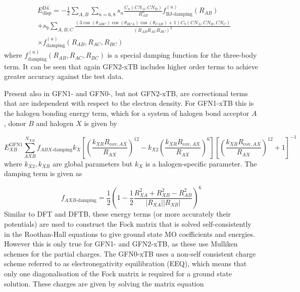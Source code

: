\begin{equation}
    \begin{split}
    &E^{\text{D4}^{\prime}}_\text{disp} = -\frac{1}{2}\sum_{A,B}\sum_{n=6,8} s_n \frac{C_n\left(CN_A, CN_B\right)}{R^n_{AB}} f^{\left(n\right)}_{\text{BJ-damping}} \left(R_{AB}\right) \\
    & + s_9 \sum_{A,B,C} \frac{\left(3\cos\left(\theta_{ABC}\right)\cos\left(\theta_{BCA}\right)\cos\left(\theta_{CAB}\right)+1\right) C_9 \left(CN_A, CN_B, CN_C\right)}{\left(R_{AB}R_{AC}R_{BC}\right)^3} \\
    & \times f^{\left(n\right)}_{\text{damping}} \left(R_{AB}, R_{AC}, R_{BC}\right)
    \end{split}
\end{equation}
%
where $f^{\left(n\right)}_{\text{damping}} \left(R_{AB}, R_{AC}, R_{BC}\right)$ is
a special damping function for the three-body term. It can be seen that again GFN2-xTB 
includes higher order terms to achieve greater accuracy against the test data.

Present also in GFN1- and GFN0-, but not GFN2-xTB, are correctional terms that are
independent with respect to the electron density. For GFN1-xTB this is the halogen
bonding energy term, which for a system of halogen bond acceptor $A$, donor $B$ and
halogen $X$ is given by

\begin{equation}
    E_{XB}^{\text{GFN}1} \sum^{N_{XB}}_{AXB} f_{ABX\text{-damping}} k_X \left[ \left( \frac{k_{XR} R_{\text{cov}, AX}}{R_{AX}}\right)^{12} - k_{X2} \left(\frac{k_{XR} R_{\text{cov}, AX}}{R_{AX}}\right)^6 \right] \left[ \left( \frac{k_{XR} R_{\text{cov}, AX}}{R_{AX}}\right)^{12} + 1\right]^{-1}
\end{equation}
%
where $k_{X2}, k_{XR}$ are global parameters but $k_X$ is a halogen-specific parameter.
The damping term is given as

\begin{equation}
    f_{AXB\text{-damping}} = \frac{1}{2} \left(1 - \frac{1}{2} \frac{R^2_{XA} + R^2_{XB} - R^2_{AB}}{\left\lvert R_{XA} \right\rvert \left\lvert R_{XB} \right\rvert} \right) ^6
\end{equation}
%
Similar to DFT and DFTB, these energy terms (or more accurately their potentials)
are used to construct the Fock matrix that is solved self-consistently in the Roothan-Hall
equations to give ground state MO coefficients and energies. However this is only
true for GFN1- and GFN2-xTB, as these use Mulliken schemes for the partial charges.
The GFN0-xTB uses a non-self consistent charge scheme referred to as electronegativity
equilibration (EEQ), which means that only one diagonalisation of the Fock matrix
is required for a ground state solution. These charges are given by solving the 
matrix equation

